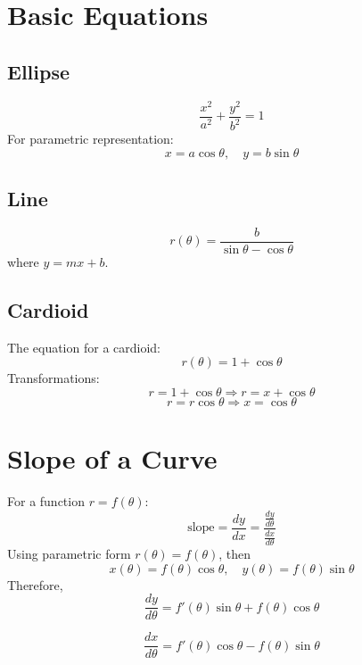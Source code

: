 \documentclass{report}
\begin{document}
\section{Basic Equations}

\subsection{Ellipse}
\[
	\frac{x^2}{a^2} + \frac{y^2}{b^2} = 1
\]
For parametric representation:
\[
	x = a \cos \theta, \quad y = b \sin \theta
\]

\subsection{Line}
\[
	r(\theta) = \frac{b}{\sin \theta - \cos \theta}
\]
where \( y = mx + b \).

\subsection{Cardioid}
The equation for a cardioid:
\[
	r(\theta) = 1 + \cos \theta
\]
Transformations:
\[
	r = 1 + \cos \theta \Rightarrow r = x + \cos \theta
\]
\[
	r = r \cos \theta \Rightarrow x = \cos \theta
\]

\section{Slope of a Curve}

For a function \( r = f(\theta) \):
\[
	\text{slope} = \frac{dy}{dx} = \frac{\frac{dy}{d\theta}}{\frac{dx}{d\theta}}
\]
Using parametric form \( r(\theta) = f(\theta) \), then
\[
	x(\theta) = f(\theta) \cos \theta, \quad y(\theta) = f(\theta) \sin \theta
\]
Therefore,
\[
	\frac{dy}{d\theta} = f'(\theta) \sin \theta + f(\theta) \cos \theta
\]


\[
	\frac{dx}{d\theta} = f'(\theta) \cos \theta - f(\theta) \sin \theta
\]

\end{document}
